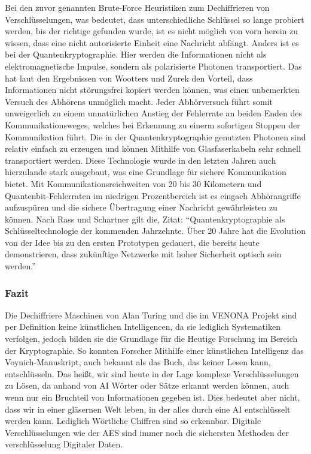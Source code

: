 Bei den zuvor genannten Brute-Force Heuristiken zum Dechiffrieren von Verschlüsselungen, was bedeutet, dass unterschiedliche Schlüssel so lange probiert werden, bis der richtige gefunden wurde, ist es nicht möglich von vorn herein zu wissen, dass eine nicht autorisierte Einheit eine Nachricht abfängt. Anders ist es bei der Quantenkryptographie. 
Hier werden die Informationen nicht als elektromagnetische Impulse, sondern als polarisierte Photonen transportiert. Das hat laut den Ergebnissen von Wootters und Zurek den Vorteil, dass Informationen nicht störungsfrei kopiert werden können, was einen unbemerkten Versuch des Abhörens unmöglich macht. \cite{rass_schartner_2002}
Jeder Abhörversuch führt somit unweigerlich zu einem unnatürlichen Anstieg der Fehlerrate an beiden Enden des Kommunikationsweges, welches bei Erkennung zu einerm sofortigen Stoppen der Kommunikation führt. \cite{rass_schartner_2002}
Die in der Quantenkryptographie genutzten Photonen sind relativ einfach zu erzeugen und können Mithilfe von Glasfaserkabeln sehr schnell transportiert werden. \cite{tittel_brendel_gisin_ribordy_zbinden_1999} Diese Technologie wurde in den letzten Jahren auch hierzulande stark ausgebaut, was eine Grundlage für sichere Kommunikation bietet.
Mit Kommunikationsreichweiten von 20 bis 30 Kilometern und Quantenbit-Fehlerraten im niedrigen Prozentbereich ist es eingach Abhörangriffe aufzuspüren und die sichere Übertragung einer Nachricht gewährleisten zu können. \cite{tittel_brendel_gisin_ribordy_zbinden_1999}
Nach Rass und Schartner gilt die, Zitat: \enquote{Quantenkryptographie als Schlüsseltechnologie der kommenden Jahrzehnte. Über 20 Jahre hat die Evolution von der Idee bis zu den ersten Prototypen gedauert, die bereits heute demonstrieren, dass zukünftige Netzwerke mit hoher Sicherheit optisch sein werden.} \cite{rass_schartner_2002}

\subsubsection{Fazit}
Die Dechiffriere Maschinen von Alan Turing und die im VENONA Projekt sind per Definition keine künstlichen Intelligencen, da sie lediglich Systematiken verfolgen, jedoch bilden sie die Grundlage für die Heutige Forschung im Bereich der Kryptographie. So konnten Forscher Mithilfe einer künstlichen Intelligenz das Voynich-Manuskript, auch bekannt als das Buch, das keiner Lesen kann, entschlüsseln. \cite{business_insider_2018}
Das heißt, wir sind heute in der Lage komplexe Verschlüsselungen zu Lösen, da anhand von \ac{AI} Wörter oder Sätze erkannt werden können, auch wenn nur ein Bruchteil von Informationen gegeben ist. Dies bedeutet aber nicht, dass wir in einer gläsernen Welt leben, in der alles durch eine \ac{AI} entschlüsselt werden kann.
Lediglich Wörtliche Chiffren sind so erkennbar. Digitale Verschlüsselungen wie der \ac{AES} sind immer noch die sichersten Methoden der verschlüsselung Digitaler Daten.